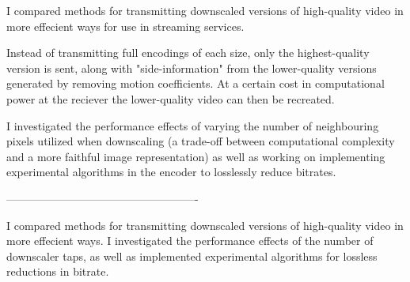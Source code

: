 I compared methods for transmitting downscaled versions of high-quality video in more effecient ways for use in streaming services.

Instead of transmitting full encodings of each size, only the highest-quality version is sent, along with "side-information" from the lower-quality versions generated by removing motion coefficients. At a certain cost in computational power at the reciever the lower-quality video can then be recreated.

I investigated the performance effects of varying the number of neighbouring pixels utilized when downscaling (a trade-off between computational complexity and a more faithful image representation) as well as working on implementing experimental algorithms in the encoder to losslessly reduce bitrates.

----------------------------------------------------

I compared methods for transmitting downscaled versions of high-quality video in more effecient ways. I investigated the performance effects of the number of downscaler taps, as well as implemented experimental algorithms for lossless reductions in bitrate.
